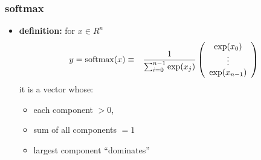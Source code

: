 \documentclass[12pt,dvipdfmx]{beamer}
\newcommand{\ao}[1]{{\color{blue}#1}}
\begin{document}
  

\begin{frame}
\frametitle{softmax}
\begin{itemize}
\item \ao{\textbf{definition:}} for $x \in R^n$
\begin{eqnarray*}
y = \mbox{softmax}(x)
& \equiv & 
\frac{1}{\sum_{i=0}^{n-1} \exp(x_j)} \left(\begin{array}{c} \exp(x_0) \\ \vdots \\ \exp(x_{n-1}) \end{array}\right) \\
\end{eqnarray*}
it is a vector whose:
\begin{itemize}
\item each component $> 0$,
\item sum of all components $= 1$
\item largest component ``dominates''
\end{itemize}
\end{itemize}

\begin{center}
\def\svgwidth{0.65\textwidth}
{\large}
\end{center}
\end{frame}
\end{document}
